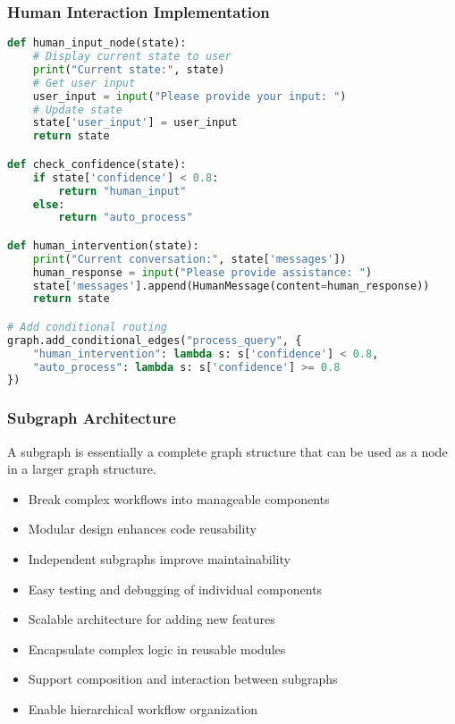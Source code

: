 \begin{frame}[fragile]\frametitle{Human Interaction Implementation}
      \begin{lstlisting}[language=Python, basicstyle=\tiny]
def human_input_node(state):
    # Display current state to user
    print("Current state:", state)
    # Get user input
    user_input = input("Please provide your input: ")
    # Update state
    state['user_input'] = user_input
    return state

def check_confidence(state):
    if state['confidence'] < 0.8:
        return "human_input"
    else:
        return "auto_process"

def human_intervention(state):
    print("Current conversation:", state['messages'])
    human_response = input("Please provide assistance: ")
    state['messages'].append(HumanMessage(content=human_response))
    return state

# Add conditional routing
graph.add_conditional_edges("process_query", {
    "human_intervention": lambda s: s['confidence'] < 0.8,
    "auto_process": lambda s: s['confidence'] >= 0.8
})
      \end{lstlisting}
\end{frame}

\begin{frame}[fragile]\frametitle{Subgraph Architecture}
A subgraph is essentially a complete graph structure that can be used as a node in a larger graph structure. 

      \begin{itemize}
        \item Break complex workflows into manageable components
        \item Modular design enhances code reusability
        \item Independent subgraphs improve maintainability
        \item Easy testing and debugging of individual components
        \item Scalable architecture for adding new features
        \item Encapsulate complex logic in reusable modules
        \item Support composition and interaction between subgraphs
        \item Enable hierarchical workflow organization
      \end{itemize}
\end{frame}

